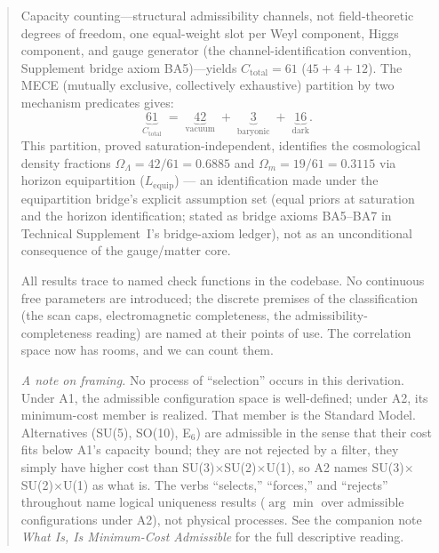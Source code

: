 \documentclass[11pt]{article}
\begin{document}
\begin{abstract}
Capacity counting---structural admissibility channels, not field-theoretic degrees of freedom, one equal-weight slot per Weyl component, Higgs component, and gauge generator (the channel-identification convention, Supplement bridge axiom BA5)---yields $C_{\mathrm{total}} = 61$ ($45 + 4 + 12$).  The MECE (mutually exclusive, collectively exhaustive) partition by two mechanism predicates gives:
\begin{equation}
\underbrace{61}_{C_{\mathrm{total}}} \;=\; \underbrace{42}_{\text{vacuum}} \;+\; \underbrace{3}_{\text{baryonic}} \;+\; \underbrace{16}_{\text{dark}}.
\label{eq:mece_abstract}
\end{equation}
This partition, proved saturation-independent, identifies the cosmological density fractions $\Omega_\Lambda = 42/61 = 0.6885$ and $\Omega_m = 19/61 = 0.3115$ via horizon equipartition ($L_{\mathrm{equip}}$) --- an identification made under the equipartition bridge's explicit assumption set (equal priors at saturation and the horizon identification; stated as bridge axioms BA5--BA7 in Technical Supplement~I's bridge-axiom ledger), not as an unconditional consequence of the gauge/matter core.

All results trace to named check functions in the codebase.  No continuous free parameters are introduced; the discrete premises of the classification (the scan caps, electromagnetic completeness, the admissibility-completeness reading) are named at their points of use.  The correlation space now has rooms, and we can count them.

\smallskip\noindent\textit{A note on framing.}  No process of ``selection'' occurs in this derivation.  Under A1, the admissible configuration space is well-defined; under A2, its minimum-cost member is realized.  That member is the Standard Model.  Alternatives (SU(5), SO(10), E$_6$) are admissible in the sense that their cost fits below A1's capacity bound; they are not rejected by a filter, they simply have higher cost than SU(3)$\times$SU(2)$\times$U(1), so A2 names SU(3)$\times$SU(2)$\times$U(1) as what is.  The verbs ``selects,'' ``forces,'' and ``rejects'' throughout name logical uniqueness results ($\arg\min$ over admissible configurations under A2), not physical processes.  See the companion note \emph{What Is, Is Minimum-Cost Admissible} for the full descriptive reading.
\end{abstract}

\tableofcontents
\newpage


\end{document}
